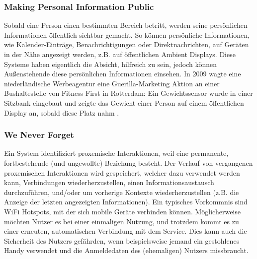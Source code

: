 \documentclass[a4paper]{article}
\begin{document}
\subsubsection{Making Personal Information Public}
\label{sssec:making_personal_information_public}
Sobald eine Person einen bestimmten Bereich betritt, werden seine persönlichen Informationen öffentlich sichtbar gemacht. So können persönliche Informationen, wie Kalender-Einträge, Benachrichtigungen oder Direktnachrichten, auf Geräten in der Nähe angezeigt werden, z.B. auf öffentlichen \glqq Ambient Displays\grqq{}. Diese Systeme haben eigentlich die Absicht, hilfreich zu sein, jedoch können Außenstehende diese persönlichen Informationen einsehen.\newline
In 2009 wagte eine niederländische Werbeagentur eine Guerilla-Marketing Aktion an einer Bushaltestelle von Fitness First in Rotterdam: Ein Gewichtssensor wurde in einer Sitzbank eingebaut und zeigte das Gewicht einer Person auf einem öffentlichen Display an, sobald diese Platz nahm \cite{fitness_first}.

\subsubsection{We Never Forget}
\label{sssec:we_never_forget}
Ein System identifiziert proxemische Interaktionen, weil eine permanente, fortbestehende (und ungewollte) Beziehung besteht. Der Verlauf von vergangenen proxemischen Interaktionen wird gespeichert, welcher dazu verwendet werden kann, Verbindungen wiederherzustellen, einen Informationsaustausch durchzuführen, und/oder um vorherige Kontexte wiederherzustellen (z.B. die Anzeige der letzten angezeigten Informationen).\newline
Ein typisches Vorkommnis sind WiFi Hotspots, mit der sich mobile Geräte verbinden können. Möglicherweise möchten Nutzer es bei einer einmaligen Nutzung, und trotzdem kommt es zu einer erneuten, automatischen Verbindung mit dem Service. Dies kann auch die Sicherheit des Nutzers gefährden, wenn beispielsweise jemand ein gestohlenes Handy verwendet und die Anmeldedaten des (ehemaligen) Nutzers missbraucht.
\end{document}
